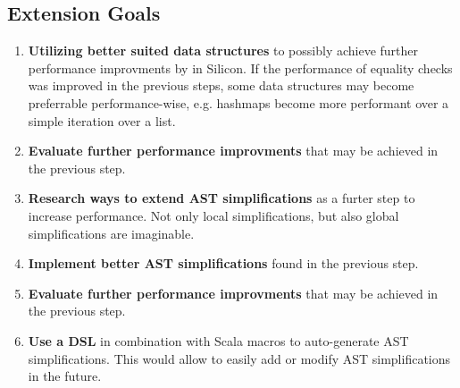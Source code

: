\documentclass{article}
\begin{document}
    \subsection{Extension Goals}
    \begin{enumerate}
        \item \textbf{Utilizing better suited data structures} to possibly achieve
        further performance improvments by in Silicon. If the performance of
        equality checks was improved in the previous steps, some data
        structures may become preferrable performance-wise, e.g. hashmaps become
        more performant over a simple iteration over a list.
        \item \textbf{Evaluate further performance improvments} that may be
        achieved in the previous step.
        \item \textbf{Research ways to extend AST simplifications} as a furter step
        to increase performance. Not only local simplifications, but also global
        simplifications are imaginable.
        \item \textbf{Implement better AST simplifications} found in the previous step.
        \item \textbf{Evaluate further performance improvments} that may be
        achieved in the previous step.
        \item \textbf{Use a DSL} in combination with Scala macros to
        auto-generate AST simplifications. This would allow to easily add or modify
        AST simplifications in the future.

    \end{enumerate}

    \printbibliography
    
\end{document}
